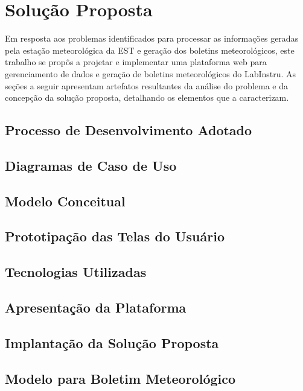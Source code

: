 \chapter{Solução Proposta} \label{cap:solucao}

Em resposta aos problemas identificados para processar as informações geradas pela estação meteorológica da EST e geração dos boletins meteorológicos, este trabalho se propôs a projetar e implementar uma plataforma web para gerenciamento de dados e geração de boletins meteorológicos do LabInstru. As seções a seguir apresentam artefatos resultantes da análise do problema e da concepção da solução proposta, detalhando os elementos que a caracterizam.


\section{Processo de Desenvolvimento Adotado}


\section{Diagramas de Caso de Uso}


\section{Modelo Conceitual}


\section{Prototipação das Telas do Usuário}


\section{Tecnologias Utilizadas}


\section{Apresentação da Plataforma}


\section{Implantação da Solução Proposta}

\section{Modelo para Boletim Meteorológico}


